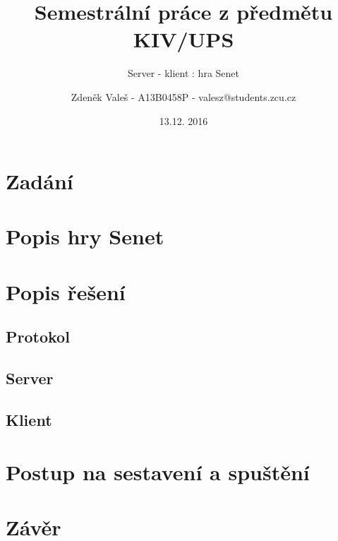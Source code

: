 \documentclass[11pt,a4paper]{scrartcl}
\begin{document}
	\title{Semestrální práce z předmětu KIV/UPS}
	\subtitle{Server - klient : hra Senet}
	\author{Zdeněk Valeš - A13B0458P - valesz@students.zcu.cz}
	\date{13.12. 2016}
	\maketitle
	\newpage
	
	\section{Zadání}
	
	\section{Popis hry Senet}
	
	\section{Popis řešení}
	
	\subsection{Protokol}
	
	\subsection{Server}
	
	\subsection{Klient}
	
	\section{Postup na sestavení a spuštění}
	
	\section{Závěr}
	
	
\end{document}
